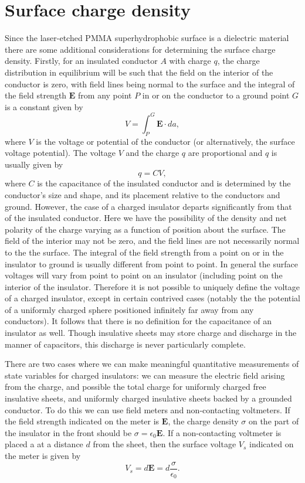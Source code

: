 \documentclass[10pt,a4paper]{article}
\begin{document}
\section{Surface charge density}
Since the laser-etched PMMA superhydrophobic surface is a dielectric material there are some additional considerations for determining the surface charge density. Firstly, for an insulated conductor $A$ with charge $q$, the charge distribution in equilibrium will be such that the field on the interior of the conductor is zero, with field lines being normal to the surface and the integral of the field strength $\mathbf{E}$ from any point $P$ in or on the conductor to a ground point $G$ is a constant given by
\[ V = \int^G_P \mathbf{E} \cdot da, \]
where $V$ is the voltage or potential of the conductor (or alternatively, the surface voltage potential). The voltage $V$ and the charge $q$ are proportional and $q$ is usually given by
\[q = CV, \]
where $C$ is the capacitance of the insulated conductor and is determined by the conductor's size and shape, and its placement relative to the conductors and ground. However, the case of a charged insulator departs significantly from that of the insulated conductor. Here we have the possibility of the density and net polarity of the charge varying as a function of position about the surface. The field of the interior may not be zero, and the field lines are not necessarily normal to the the surface. The integral of the field strength from a point on or in the insulator to ground is usually different from point to point. In general the surface voltages will vary from point to point on an insulator (including point on the interior of the insulator. Therefore it is not possible to uniquely define the voltage of a charged insulator, except in certain contrived cases (notably the the potential of a uniformly charged sphere positioned infinitely far away from any conductors). It follows that there is no definition for the capacitance of an insulator as well. Though insulative sheets may store charge and discharge in the manner of capacitors, this discharge is never particularly complete.

There are two cases where we can make meaningful quantitative measurements of state variables for charged insulators: we can measure the electric field arising from the charge, and possible the total charge for uniformly charged free insulative sheets, and uniformly charged insulative sheets backed by a grounded conductor. To do this we can use field meters and non-contacting voltmeters. If the field strength indicated on the meter is $\mathbf{E}$, the charge density $\sigma$ on the part of the insulator in the front should be $\sigma = \epsilon_0 \mathbf{E}$. If a non-contacting voltmeter is placed a at a distance $d$ from the sheet, then the surface voltage $V_s$ indicated on the meter is given by 
\[V_s = d \mathbf{E} = d \frac{\sigma}{\epsilon_0}. \]
\end{document}

